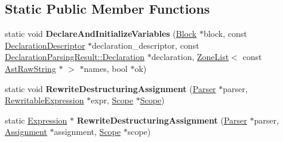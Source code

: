 \subsection*{Static Public Member Functions}
\begin{DoxyCompactItemize}
\item 
static void {\bfseries Declare\+And\+Initialize\+Variables} (\hyperlink{classv8_1_1internal_1_1_block}{Block} $\ast$block, const \hyperlink{structv8_1_1internal_1_1_parser_1_1_declaration_descriptor}{Declaration\+Descriptor} $\ast$declaration\+\_\+descriptor, const \hyperlink{structv8_1_1internal_1_1_parser_1_1_declaration_parsing_result_1_1_declaration}{Declaration\+Parsing\+Result\+::\+Declaration} $\ast$declaration, \hyperlink{classv8_1_1internal_1_1_zone_list}{Zone\+List}$<$ const \hyperlink{classv8_1_1internal_1_1_ast_raw_string}{Ast\+Raw\+String} $\ast$ $>$ $\ast$names, bool $\ast$ok)\hypertarget{classv8_1_1internal_1_1_parser_1_1_pattern_rewriter_a88a25693a11f90718da9f4ac55f44549}{}\label{classv8_1_1internal_1_1_parser_1_1_pattern_rewriter_a88a25693a11f90718da9f4ac55f44549}

\item 
static void {\bfseries Rewrite\+Destructuring\+Assignment} (\hyperlink{classv8_1_1internal_1_1_parser}{Parser} $\ast$parser, \hyperlink{classv8_1_1internal_1_1_rewritable_expression}{Rewritable\+Expression} $\ast$expr, \hyperlink{classv8_1_1internal_1_1_scope}{Scope} $\ast$\hyperlink{classv8_1_1internal_1_1_scope}{Scope})\hypertarget{classv8_1_1internal_1_1_parser_1_1_pattern_rewriter_ac4edf6d7fea8ecb21d9b2c74efcf3468}{}\label{classv8_1_1internal_1_1_parser_1_1_pattern_rewriter_ac4edf6d7fea8ecb21d9b2c74efcf3468}

\item 
static \hyperlink{classv8_1_1internal_1_1_expression}{Expression} $\ast$ {\bfseries Rewrite\+Destructuring\+Assignment} (\hyperlink{classv8_1_1internal_1_1_parser}{Parser} $\ast$parser, \hyperlink{classv8_1_1internal_1_1_assignment}{Assignment} $\ast$assignment, \hyperlink{classv8_1_1internal_1_1_scope}{Scope} $\ast$scope)\hypertarget{classv8_1_1internal_1_1_parser_1_1_pattern_rewriter_a19d577e15211c6e888c9e5804838abb5}{}\label{classv8_1_1internal_1_1_parser_1_1_pattern_rewriter_a19d577e15211c6e888c9e5804838abb5}

\end{DoxyCompactItemize}
